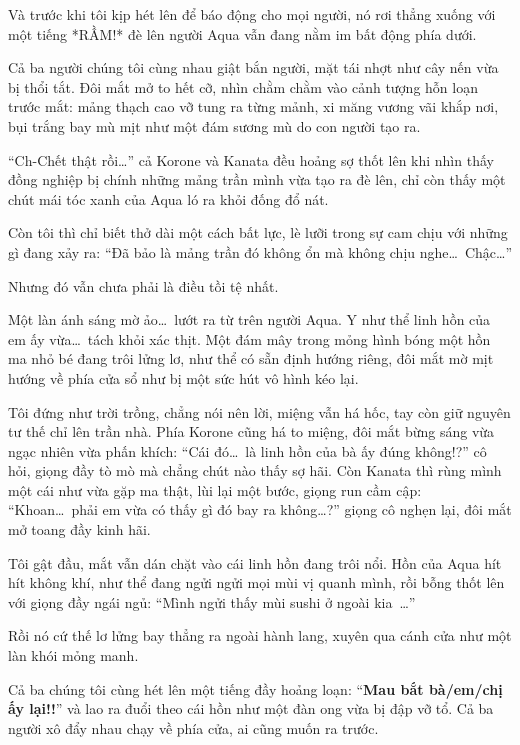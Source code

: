 \documentclass[../main.tex]{subfiles}
\begin{document}
Và trước khi tôi kịp hét lên để báo động cho mọi người, nó rơi thẳng xuống với một tiếng *RẦM!* đè lên người Aqua vẫn đang nằm im bất động phía dưới.


Cả ba người chúng tôi cùng nhau giật bắn người, mặt tái nhợt như cây nến vừa bị thổi tắt. Đôi mắt mở to hết cỡ, nhìn chằm chằm vào cảnh tượng hỗn loạn trước mắt: mảng thạch cao vỡ tung ra từng mảnh, xi măng vương vãi khắp nơi, bụi trắng bay mù mịt như một đám sương mù do con người tạo ra.

``Ch-Chết thật rồi\dots'' cả Korone và Kanata đều hoảng sợ thốt lên khi nhìn thấy đồng nghiệp bị chính những mảng trần mình vừa tạo ra đè lên, chỉ còn thấy một chút mái tóc xanh của Aqua ló ra khỏi đống đổ nát.

Còn tôi thì chỉ biết thở dài một cách bất lực, lè lưỡi trong sự cam chịu với những gì đang xảy ra: ``Đã bảo là mảng trần đó không ổn mà không chịu nghe\dots\ Chậc\dots''

Nhưng đó vẫn chưa phải là điều tồi tệ nhất.

Một làn ánh sáng mờ ảo\dots\ lướt ra từ trên người Aqua. Y như thể linh hồn của em ấy vừa\dots\ tách khỏi xác thịt. Một đám mây trong mỏng hình bóng một hồn ma nhỏ bé đang trôi lửng lơ, như thể có sẵn định hướng riêng, đôi mắt mờ mịt hướng về phía cửa sổ như bị một sức hút vô hình kéo lại.


Tôi đứng như trời trồng, chẳng nói nên lời, miệng vẫn há hốc, tay còn giữ nguyên tư thế chỉ lên trần nhà. Phía Korone cũng há to miệng, đôi mắt bừng sáng vừa ngạc nhiên vừa phấn khích: ``Cái đó\dots\ là linh hồn của bà ấy đúng không!?'' cô hỏi, giọng đầy tò mò mà chẳng chút nào thấy sợ hãi. Còn Kanata thì rùng mình một cái như vừa gặp ma thật, lùi lại một bước, giọng run cầm cập: ``Khoan\dots\ phải em vừa có thấy gì đó bay ra không\dots?'' giọng cô nghẹn lại, đôi mắt mở toang đầy kinh hãi.

Tôi gật đầu, mắt vẫn dán chặt vào cái linh hồn đang trôi nổi. Hồn của Aqua hít hít không khí, như thể đang ngửi ngửi mọi mùi vị quanh mình, rồi bỗng thốt lên với giọng đầy ngái ngủ: ``Mình ngửi thấy mùi sushi ở ngoài kia~{}\dots''

Rồi nó cứ thế lơ lửng bay thẳng ra ngoài hành lang, xuyên qua cánh cửa như một làn khói mỏng manh.

Cả ba chúng tôi cùng hét lên một tiếng đầy hoảng loạn: ``\textbf{Mau bắt bà/em/chị ấy lại!!}'' và lao ra đuổi theo cái hồn như một đàn ong vừa bị đập vỡ tổ. Cả ba người xô đẩy nhau chạy về phía cửa, ai cũng muốn ra trước.
\end{document}
